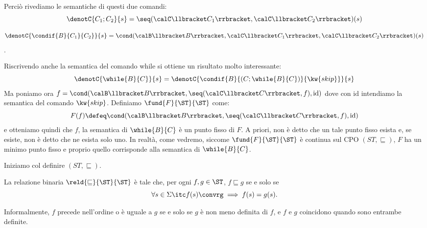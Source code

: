 Perciò rivediamo le semantiche di questi due comandi:
$$ \denotC{C_1 ; C_2}{s} = \seq(\calC \llbracket C_1 \rrbracket, \calC \llbracket C_2 \rrbracket)(s)$$

$$\denotC{\condif{B}{C_1}{C_2}}{s} = \cond(\calB \llbracket B \rrbracket, \calC \llbracket C_1 \rrbracket, \calC \llbracket C_2 \rrbracket)(s)$$.

Riscrivendo anche la semantica del comando while si ottiene un risultato molto interessante:
$$ \denotC{\while{B}{C}}{s} = \denotC{\condif{B}{(C ; \while{B}{C})}{\kw{skip}}}{s}$$
Ma poniamo ora $f = \cond(\calB \llbracket B \rrbracket, \seq(\calC \llbracket C \rrbracket, f), \mathrm{id})$ dove con $\mathrm{id}$ intendiamo la semantica del comando $\kw{skip}$.
Definiamo $\fund{F}{\ST}{\ST}$ come:
\[
F(f) \defeq \cond(\calB \llbracket B \rrbracket, \seq(\calC \llbracket C \rrbracket, f), \mathrm{id})
\]
e otteniamo quindi che $f$, la semantica di $\while{B}{C}$ è un punto fisso
di $F$.
A priori, non \`e detto che un tale punto fisso esista e, se esiste,
non \`e detto che ne esista solo uno.
In realt\`a, come vedremo, siccome $\fund{F}{\ST}{\ST}$ \`e continua
sul CPO $(ST, \sqsubseteq)$, $F$ ha un minimo punto fisso e proprio
quello corrisponde alla semantica di $\while{B}{C}$.

Iniziamo col definire $(ST, \sqsubseteq)$.

\begin{definizione} 
La relazione binaria $\reld{\sqsubseteq}{\ST}{\ST}$ \`e tale che,
per ogni $f, g \in \ST$,  $f \sqsubseteq g$ se e solo se
\[
  \forall s \in \Sigma \itc f(s)\convrg \implies f(s) = g(s).
\]
\end{definizione}
Informalmente, $f$ precede nell'ordine o \`e uguale a $g$ se e solo se
$g$ è non meno definita di $f$, e $f$ e $g$ coincidono quando sono entrambe
definite.


